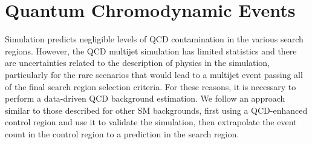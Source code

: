 \section{Quantum Chromodynamic Events}
\label{subsec:QCD}

Simulation predicts negligible levels of QCD contamination in the various search regions. However, the QCD multijet simulation has limited statistics and there are uncertainties related to the description of physics in the simulation, particularly for the rare scenarios that would lead to a multijet event passing all of the final search region selection criteria. For these reasons, it is necessary to perform a data-driven QCD background estimation. We follow an approach similar to those described for other SM backgrounds, first using a QCD-enhanced control region and use it to validate the simulation, then extrapolate the event count in the control region to a prediction in the search region. 

